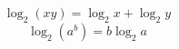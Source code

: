 \documentclass{article} %
\begin{document}
\begin{equation}
\log_{2}(xy)=\log_2x + \log_2y
\end{equation}
\setcounter{equation}{2}
\begin{equation}
\log_{2}(a^b)=b\log_2a
\end{equation}
\end{document}
